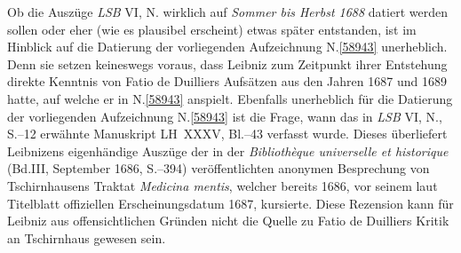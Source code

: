 Ob die Auszüge \textit{LSB} VI, N.\cite{02546} wirklich auf \textit{Sommer bis Herbst 1688} datiert werden sollen oder eher (wie es plausibel erscheint) etwas später entstanden, ist im Hinblick auf die Datierung der vorliegenden Aufzeichnung N.\;\ref{58943} unerheblich.
Denn sie setzen keineswegs voraus, dass Leibniz zum Zeitpunkt ihrer Entstehung direkte Kenntnis von Fatio de Duilliers Aufsätzen aus den Jahren 1687\cite{02539} und 1689\cite{02540} hatte, auf welche er in N.\;\ref{58943} anspielt.
\pend%
\pstart%
Ebenfalls unerheblich für die Datierung der vorliegenden Aufzeichnung N.\;\ref{58943} ist die Frage, wann das in \textit{LSB} VI, N.,\cite{02546} S.--12 erwähnte Manuskript LH~XXXV, Bl.--43 verfasst wurde.
Dieses überliefert Leibnizens eigenhändige Auszüge der in der \textit{Bibliothèque universelle et historique} (Bd.\;III, September 1686, S.--394)\cite{02545} veröffentlichten anonymen Besprechung\cite{02550} von Tschirnhausens Traktat \textit{Medicina mentis},\cite{02542} welcher bereits 1686, vor seinem laut Titelblatt offiziellen Erscheinungsdatum 1687, kursierte.
Diese Rezension kann für Leibniz aus offensichtlichen Gründen nicht die Quelle zu Fatio de Duilliers Kritik an Tschirnhaus gewesen sein.
\pend%
%
\frenchspacing%
\normalsize%
